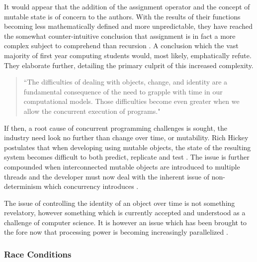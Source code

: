 \documentclass[12pt,a4paper]{article}
\begin{document}
It would appear that the addition of the assignment operator and the concept of mutable state is of concern to the authors. With the results of their functions becoming less mathematically defined and more unpredictable, they have reached the somewhat counter-intuitive conclusion that assignment is in fact a more complex subject to comprehend than recursion \cite{structureAndInterpretation}. A conclusion which the vast majority of first year computing students would, most likely, emphatically refute. They elaborate further, detailing the primary culprit of this increased complexity.

\begin{quote}
    ``The difficulties of dealing with objects, change, and identity are a fundamental consequence of the need to grapple with time in our computational models. Those difficulties become even greater when we allow the concurrent execution of programs." \cite{structureAndInterpretation}
\end{quote}

If then, a root cause of concurrent programming challenges is sought, the industry need look no further than change over time, or mutability. Rich Hickey postulates that when developing using mutable objects, the state of the resulting system becomes difficult to both predict, replicate and test \cite{areWeThereYet}. The issue is further compounded when interconnected mutable objects are introduced to multiple threads and the developer must now deal with the inherent issue of non-determinism which concurrency introduces \cite{concurrencyChallenges}.

The issue of controlling the identity of an object over time is not something revelatory, however something which is currently accepted and understood as a challenge of computer science. It is however an issue which has been brought to the fore now that processing power is becoming increasingly parallelized \cite{concurrencyChallenges,theConcurrencyChallenge}.

\subsubsection{Race Conditions}
\end{document}
